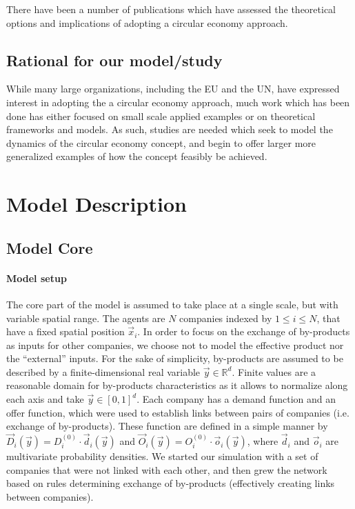 \documentclass{article}
\begin{document}
There have been a number of publications which have assessed the theoretical options and implications of adopting a circular economy approach. 

\subsection{Rational for our model/study}

While many large organizations, including the EU and the UN,  have expressed interest in adopting the a circular economy approach, much work which has been done has either focused on small scale applied examples or on theoretical frameworks and models. As such, studies are needed which seek to model the dynamics of the circular economy concept, and begin to offer larger more generalized examples of how the concept feasibly be achieved. 


\section{Model Description}

\subsection{Model Core}

\paragraph{Model setup}

The core part of the model is assumed to take place at a single scale, but with variable spatial range. The agents are $N$ companies indexed by $1\leq i\leq N$, that have a fixed spatial position $\vec{x}_i$. In order to focus on the exchange of by-products as inputs for other companies, we choose not to model the effective product nor the ``external'' inputs. For the sake of simplicity, by-products are assumed to be described by a finite-dimensional real variable $\vec{y}\in \mathbb{R}^d$. Finite values are a reasonable domain for by-products characteristics as it allows to normalize along each axis and take $\vec{y} \in \left[0,1\right]^d$. Each company has a demand function and an offer function, which were used to establish links between pairs of companies (i.e. exchange of by-products). These function are defined in a simple manner by $\vec{D}_i (\vec{y})= D_i^{(0)}\cdot \vec{d}_i (\vec{y})$ and $\vec{O}_i (\vec{y})= O_i^{(0)}\cdot \vec{o}_i (\vec{y})$, where $\vec{d}_i$ and $\vec{o}_i$ are multivariate probability densities. We started our simulation with a set of companies that were not linked with each other, and then grew the network based on rules determining exchange of by-products (effectively creating links between companies).
\end{document}
